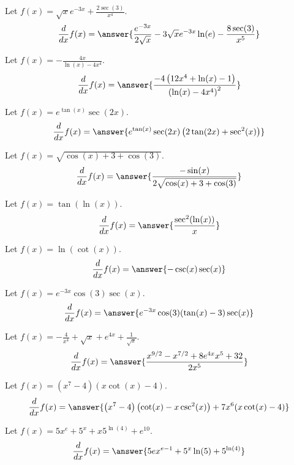 \documentclass{ximera}
\begin{document}
\begin{shuffle}
\begin{exercise}
Let $f(x)=\sqrt{x} e^{-3 x}+\frac{2 \sec (3)}{x^4}$.
\[
\ddx f(x) = \answer{\frac{e^{-3 x}}{2 \sqrt{x}}-3 \sqrt{x} e^{-3 x} \ln (e)-\frac{8 \sec (3)}{x^5}}
\]
\end{exercise}

\begin{exercise}
Let $f(x)=-\frac{4 x}{\ln (x)-4 x^4}$.
\[
\ddx f(x) = \answer{\frac{-4 \left(12 x^4+\ln (x)-1\right)}{\left(\ln (x)-4 x^4\right)^2}}
\]
\end{exercise}

\begin{exercise}
Let $f(x)=e^{\tan (x)} \sec (2 x)$.
\[
\ddx f(x) = \answer{e^{\tan (x)} \sec (2 x) \left(2 \tan (2 x)+\sec ^2(x)\right)}
\]
\end{exercise}

\begin{exercise}
Let $f(x)=\sqrt{\cos (x)+3+\cos (3)}$.
\[
\ddx f(x) = \answer{\frac{-\sin (x)}{2 \sqrt{\cos (x)+3+\cos (3)}}}
\]
\end{exercise}

\begin{exercise}
Let $f(x)=\tan (\ln (x))$.
\[
\ddx f(x) = \answer{\frac{\sec ^2(\ln (x))}{x}}
\]
\end{exercise}

\begin{exercise}
Let $f(x)=\ln (\cot (x))$.
\[
\ddx f(x) = \answer{-\csc (x) \sec (x)}
\]
\end{exercise}

\begin{exercise}
Let $f(x)=e^{-3 x} \cos (3) \sec (x)$.
\[
\ddx f(x) = \answer{e^{-3 x} \cos (3) (\tan (x)-3) \sec (x)}
\]
\end{exercise}

\begin{exercise}
Let $f(x)=-\frac{4}{x^4}+\sqrt{x}+e^{4 x}+\frac{1}{\sqrt{x}}$.
\[
\ddx f(x) = \answer{\frac{x^{9/2}-x^{7/2}+8 e^{4 x} x^5+32}{2 x^5}}
\]
\end{exercise}

\begin{exercise}
Let $f(x)=\left(x^7-4\right) (x \cot (x)-4)$.
\[
\ddx f(x) = \answer{\left(x^7-4\right) \left(\cot (x)-x \csc ^2(x)\right)+7 x^6 (x \cot (x)-4)}
\]
\end{exercise}

\begin{exercise}
Let $f(x)=5 x^e+5^x+x 5^{\ln (4)}+e^{10}$.
\[
\ddx f(x) = \answer{5 e x^{e-1}+5^x \ln (5)+5^{\ln (4)}}
\]
\end{exercise}


\end{shuffle}
\end{document}
